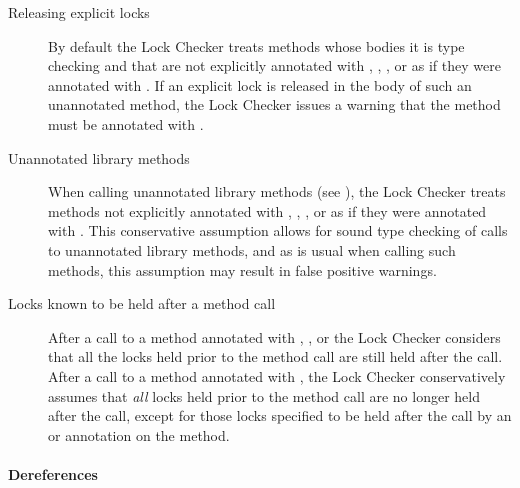 \begin{description}
\item[Releasing explicit locks]
  By default the Lock Checker treats methods whose bodies it is type checking and
  that are not explicitly annotated with , ,
  ,  or 
  as if they were annotated with .  If an explicit lock is
  released in the body of such an unannotated method, the Lock Checker issues a warning that the
  method must be annotated with .

\item[Unannotated library methods]
  When calling unannotated library methods (see ),
  the Lock Checker treats methods not explicitly annotated with ,
  , ,  or 
  as if they were annotated with .
  This conservative assumption allows for sound type checking of calls to
  unannotated library methods, and as is usual when calling such methods,
  this assumption may result in false positive warnings.

\item[Locks known to be held after a method call]
  After a call to a method annotated with ,
  ,  or 
  the Lock Checker considers that all the
  locks held prior to the method call are still held after the call.
  After a call to a method annotated with ,
  the Lock Checker conservatively assumes that \emph{all} locks held
  prior to the method call are no longer held after the call,
  except for those locks specified to be held after the call
  by an  or 
  annotation on the method.

\end{description}

\paragraph{Dereferences}

